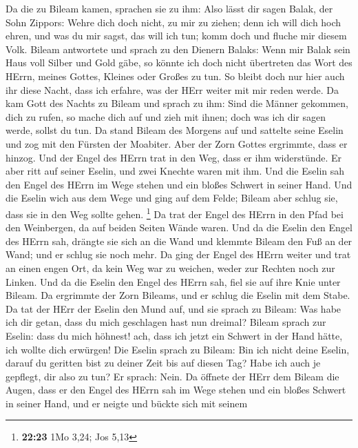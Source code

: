 Da die zu Bileam kamen, sprachen sie zu ihm: Also lässt dir sagen Balak,
der Sohn Zippors: Wehre dich doch nicht, zu mir zu ziehen;
 denn ich will dich hoch ehren, und was du mir sagst, das
will ich tun; komm doch und fluche mir diesem Volk. 
Bileam antwortete und sprach zu den Dienern Balaks: Wenn mir Balak sein
Haus voll Silber und Gold gäbe, so könnte ich doch nicht übertreten das
Wort des HErrn, meines Gottes, Kleines oder Großes zu tun.
 So bleibt doch nur hier auch ihr diese Nacht, dass ich
erfahre, was der HErr weiter mit mir reden werde.  Da kam
Gott des Nachts zu Bileam und sprach zu ihm: Sind die Männer gekommen,
dich zu rufen, so mache dich auf und zieh mit ihnen; doch was ich dir
sagen werde, sollst du tun.  Da stand Bileam des Morgens
auf und sattelte seine Eselin und zog mit den Fürsten der Moabiter.
 Aber der Zorn Gottes ergrimmte, dass er hinzog. Und der
Engel des HErrn trat in den Weg, dass er ihm widerstünde. Er aber ritt
auf seiner Eselin, und zwei Knechte waren mit ihm.  Und
die Eselin sah den Engel des HErrn im Wege stehen und ein bloßes Schwert
in seiner Hand. Und die Eselin wich aus dem Wege und ging auf dem Felde;
Bileam aber schlug sie, dass sie in den Weg sollte gehen. \footnote{\textbf{22:23}
  1Mo 3,24; Jos 5,13}  Da trat der Engel des HErrn in den
Pfad bei den Weinbergen, da auf beiden Seiten Wände waren.
 Und da die Eselin den Engel des HErrn sah, drängte sie
sich an die Wand und klemmte Bileam den Fuß an der Wand; und er schlug
sie noch mehr.  Da ging der Engel des HErrn weiter und
trat an einen engen Ort, da kein Weg war zu weichen, weder zur Rechten
noch zur Linken.  Und da die Eselin den Engel des HErrn
sah, fiel sie auf ihre Knie unter Bileam. Da ergrimmte der Zorn Bileams,
und er schlug die Eselin mit dem Stabe.  Da tat der HErr
der Eselin den Mund auf, und sie sprach zu Bileam: Was habe ich dir
getan, dass du mich geschlagen hast nun dreimal?  Bileam
sprach zur Eselin: dass du mich höhnest! ach, dass ich jetzt ein Schwert
in der Hand hätte, ich wollte dich erwürgen!  Die Eselin
sprach zu Bileam: Bin ich nicht deine Eselin, darauf du geritten bist zu
deiner Zeit bis auf diesen Tag? Habe ich auch je gepflegt, dir also zu
tun? Er sprach: Nein.  Da öffnete der HErr dem Bileam die
Augen, dass er den Engel des HErrn sah im Wege stehen und ein bloßes
Schwert in seiner Hand, und er neigte und bückte sich mit seinem
